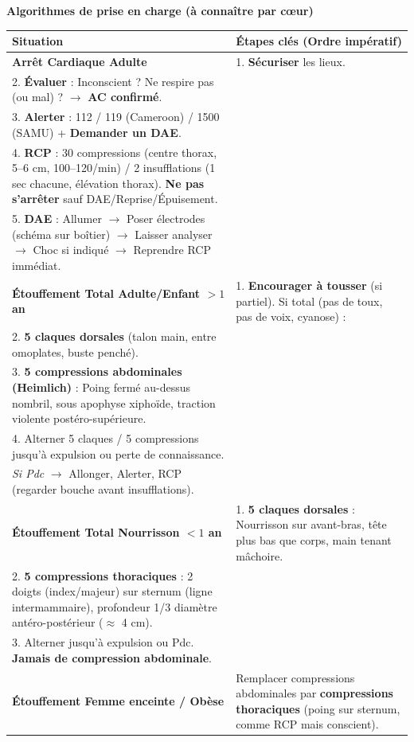 \documentclass[11pt]{article}
\begin{document}
\begin{bilan}
\textbf{Algorithmes de prise en charge (à connaître par cœur)}
\begin{center}
\begin{tabularx}{\linewidth}{|l|X|}\hline
\textbf{Situation} & \textbf{Étapes clés (Ordre impératif)} \\ \hline
\rowcolor{popblueL}
\textbf{Arrêt Cardiaque Adulte} &
1. \textbf{Sécuriser} les lieux. \\
2. \textbf{Évaluer} : Inconscient ? Ne respire pas (ou mal) ? $\rightarrow$ \textbf{AC confirmé}. \\
3. \textbf{Alerter} : 112 / 119 (Cameroon) / 1500 (SAMU) + \textbf{Demander un DAE}. \\
4. \textbf{RCP} : 30 compressions (centre thorax, 5--6 cm, 100--120/min) / 2 insufflations (1 sec chacune, élévation thorax). \textbf{Ne pas s'arrêter} sauf DAE/Reprise/Épuisement. \\
5. \textbf{DAE} : Allumer $\rightarrow$ Poser électrodes (schéma sur boîtier) $\rightarrow$ Laisser analyser $\rightarrow$ Choc si indiqué $\rightarrow$ Reprendre RCP immédiat. \\ \hline
\rowcolor{poporangeL}
\textbf{Étouffement Total Adulte/Enfant $>1$ an} &
1. \textbf{Encourager à tousser} (si partiel). Si total (pas de toux, pas de voix, cyanose) : \\
2. \textbf{5 claques dorsales} (talon main, entre omoplates, buste penché). \\
3. \textbf{5 compressions abdominales (Heimlich)} : Poing fermé au-dessus nombril, sous apophyse xiphoïde, traction violente postéro-supérieure. \\
4. Alterner 5 claques / 5 compressions jusqu'à expulsion ou perte de connaissance. \\
\textit{Si Pdc} $\rightarrow$ Allonger, Alerter, RCP (regarder bouche avant insufflations). \\ \hline
\rowcolor{popgreenL}
\textbf{Étouffement Total Nourrisson $<1$ an} &
1. \textbf{5 claques dorsales} : Nourrisson sur avant-bras, tête plus bas que corps, main tenant mâchoire. \\
2. \textbf{5 compressions thoraciques} : 2 doigts (index/majeur) sur sternum (ligne intermammaire), profondeur 1/3 diamètre antéro-postérieur ($\approx$ 4 cm). \\
3. Alterner jusqu'à expulsion ou Pdc. \textbf{Jamais de compression abdominale}. \\ \hline
\rowcolor{poppurpleL}
\textbf{Étouffement Femme enceinte / Obèse} &
Remplacer compressions abdominales par \textbf{compressions thoraciques} (poing sur sternum, comme RCP mais conscient). \\

\end{tabularx}
\end{center}
\end{bilan}
\end{document}
